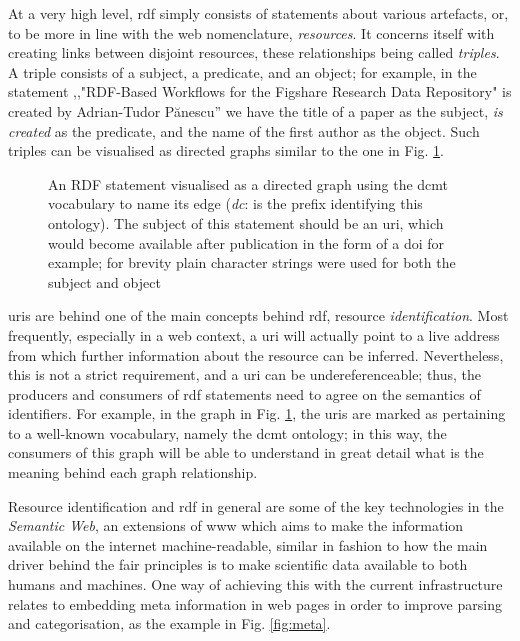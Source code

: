At a very high level, \gls{rdf} simply consists of statements about various artefacts, or, to be more in line with the web nomenclature, \emph{resources}. It concerns itself with creating links between disjoint resources, these relationships being called \emph{triples}. 
A triple consists of a subject, a predicate, and an object; for example, in the statement ,,"RDF-Based Workflows for the
Figshare Research Data Repository" is created by Adrian-Tudor P\u{a}nescu'' we have the title of a paper as the
subject, \emph{is created} as the predicate, and the name of the first author as the object. Such triples can be visualised
as directed graphs similar to the one in Fig. \ref{fig:graphinit}.

\begin{figure}[thpb]
  \centering
  \caption{An RDF statement visualised as a directed graph using the \gls{dcmt} vocabulary to name its edge (\emph{dc}: is the prefix identifying this ontology). The subject of this statement should be an \gls{uri}, which would become available after publication in the form of a \gls{doi} for example; for brevity plain character strings were used for both the subject and object}
  \label{fig:graphinit}
\end{figure}

\glspl{uri} are behind one of the main concepts behind \gls{rdf}, resource \emph{identification}. Most frequently, especially in a web context, a \gls{uri} will actually point to a live address from which further information about the resource can be inferred. Nevertheless, this is not a strict requirement, and a \gls{uri} can be undereferenceable; thus, the producers and consumers of \gls{rdf} statements need to agree on the semantics of identifiers. For example, in the graph in Fig. \ref{fig:graphinit}, the \glspl{uri} are marked as pertaining to a well-known vocabulary, namely the \gls{dcmt} ontology; in this way, the consumers of this graph will be able to understand in great detail what is the meaning behind each graph relationship.

Resource identification and \gls{rdf} in general are some of the key technologies in the \emph{Semantic Web}, an extensions of \gls{www} which aims to make the information available on the internet machine-readable, similar in fashion to how the main driver behind the \gls{fair} principles is to make scientific data available to both humans and machines. One way of achieving this with the current infrastructure relates to embedding meta information in web pages in order to improve parsing and categorisation, as the example in Fig. \ref{fig:meta}.

